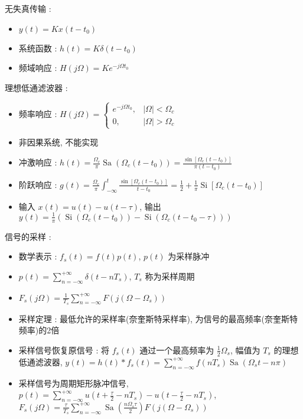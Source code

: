 \documentclass[UTF8, 12pt]{ctexart}
\begin{document}
	无失真传输 :
	\begin{itemize}[leftmargin = 4em]
		\item $ y(t) = Kx(t-t_{0}) $
		\item 系统函数 : $ h(t) = K\delta(t-t_{0}) $
		\item 频域响应 : $ H(j\Omega) = Ke^{-j\Omega t_{0}} $
	\end{itemize}

	理想低通滤波器 :
	\begin{itemize}[leftmargin = 4em]
		\item 频率响应 : $ H(j\Omega) = \begin{cases} e^{-j\Omega t_{0}},& |\Omega| < \Omega_{c} \\ 0,& |\Omega| > \Omega_{c} \end{cases} $
		\item 非因果系统, 不能实现
		\item 冲激响应 : $ h(t) = \frac{\Omega_{c}}{\pi}\operatorname{Sa}(\Omega_{c}(t-t_{0})) = \frac{\sin[\Omega_{c}(t-t_{0})]}{\pi(t-t_{0})} $
		\item 阶跃响应 : $ g(t) = \frac{\Omega_{c}}{\pi} \int_{-\infty}^{t}\frac{\sin[\Omega_{c}(t-t_{0})]}{t-t_{0}} = \frac{1}{2} + \frac{1}{\pi}\operatorname{Si}[\Omega_{c}(t-t_{0})] $
		\item 输入 $ x(t) = u(t) - u(t-\tau) $, 输出 $ y(t) = \frac{1}{\pi}(\operatorname{Si}(\Omega_{c}(t-t_{0}))-\operatorname{Si}(\Omega_{c}(t-t_{0}-\tau))) $
	\end{itemize}

	信号的采样 :
	\begin{itemize}[leftmargin = 4em]
		\item 数学表示 : $ f_{s}(t) = f(t)p(t) $, $ p(t) $ 为采样脉冲
		\item $ p(t) = \sum\limits_{n=-\infty}^{+\infty}\delta(t-nT_{s}) $, $ T_{s} $ 称为采样周期
		\item $ F_{s}(j\Omega) = \frac{1}{T_{s}} \sum\limits_{n=-\infty}^{+\infty}F(j(\Omega-\Omega_{s})) $
		\item 采样定理 : 最低允许的采样率(奈奎斯特采样率), 为信号的最高频率(奈奎斯特频率)的2倍
		\item 采样信号恢复原信号 : 将 $ f_{s}(t) $ 通过一个最高频率为 $ \frac{1}{2}\Omega_{s} $, 幅值为 $ T_{s} $ 的理想低通滤波器, 
		$ y(t) = h(t)*f_{s}(t) = \sum\limits_{n=-\infty}^{+\infty}f(nT_{s})\operatorname{Sa}(\Omega_{s}t-n\pi) $
		\item 采样信号为周期矩形脉冲信号, $ p(t) = \sum\limits_{n=-\infty}^{+\infty}u(t+\frac{\tau}{2}-nT_{s})-u(t-\frac{\tau}{2}-nT_{s}) $, \\
		$ F_{s}(j\Omega) = \frac{\tau}{T_{s}}\sum\limits_{n=-\infty}^{+\infty}\operatorname{Sa}(\frac{n\Omega_{s}\tau}{2})F(j(\Omega-\Omega_{s})) $
	\end{itemize}
\end{document}

